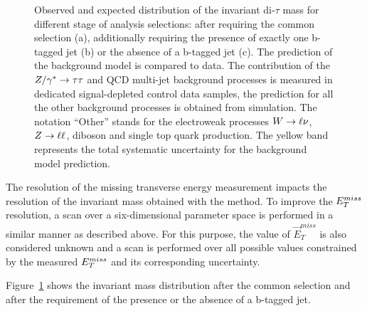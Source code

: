 \begin{figure}[p]
\begin{center}
    \end{center}
     	

    \caption{Observed and expected distribution of the 
	invariant di-$\tau$ mass \mmc for different stage of analysis selections: after requiring the common selection (a),
	additionally requiring the presence of exactly one b-tagged jet (b) or the absence of a b-tagged jet (c).
	The prediction of the  background model is compared to  data.
        The contribution of the $Z/\gamma^*\rightarrow \tau\tau$ and QCD multi-jet background processes is measured in  dedicated  signal-depleted control data samples,
        the prediction for all the other background processes is obtained from simulation.
        The notation ``Other'' stands  for the electroweak processes $W\rightarrow \ell \nu$, $Z\rightarrow \ell \ell$, diboson and single top quark production.
        The yellow band represents the total systematic uncertainty for the background model prediction.}
   \label{fig:mass}
\end{figure}


The resolution of the missing transverse energy measurement impacts the resolution of the invariant mass obtained with the \mmc method.
To improve the $E_{T}^{miss}$ resolution, a scan over a six-dimensional parameter space is performed 
in a similar manner as described above. For this purpose, the value of $\vec{E}_T^{miss}$ is also considered unknown and a scan 
is performed over all possible values constrained by the measured $E_{T}^{miss}$ and its corresponding uncertainty.
%

Figure~\ref{fig:mass} shows the  \mmc invariant mass distribution after the common selection and after the requirement of the presence or the
absence of a b-tagged jet.

 

